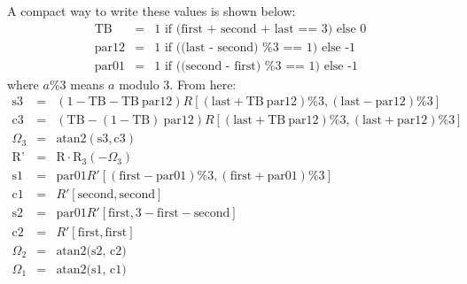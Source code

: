 \documentclass[prb]{revtex4}%
\begin{document}
A compact way to write these values is shown below:
\begin{eqnarray}
  \textrm{TB} &=&   \textrm{1 if (first + second + last == 3) else 0}\\
  \textrm{par12} &=& \textrm{1 if ((last - second) \%3 == 1) else -1} \\
  \textrm{par01} &=&  \textrm{1 if ((second - first) \%3 == 1) else -1}
\end{eqnarray}
where $a \%3$ means $a$ modulo 3.
From here:
\begin{eqnarray}
    \textrm{s3}&=&(1-\textrm{TB}-\textrm{TB}\ \textrm{par12}) R[(\textrm{last}+\textrm{TB}\ \textrm{par12})\%3,(\textrm{last}-\textrm{par12})\%3]\\
    \textrm{c3}&=&(\textrm{TB}-(1-\textrm{TB})\ \textrm{par12})R[(\textrm{last}+\textrm{TB}\ \textrm{par12})\%3,(\textrm{last}+\textrm{par12})\%3]\\
    \Omega_3&=&\textrm{atan2}(\textrm{s3},\textrm{c3})\\
    \textrm{R'}&=&\textrm{R} \cdot \textrm{R}_3(-\Omega_3)\\
    \textrm{s1}&=&\textrm{par01}  R'[(\textrm{first}-\textrm{par01})\%3,(\textrm{first}+\textrm{par01})\%3]\\
    \textrm{c1}&=&R'[\textrm{second},\textrm{second}]\\
    \textrm{s2}&=&\textrm{par01} R'[\textrm{first}, 3 - \textrm{first} - \textrm{second}]\\
    \textrm{c2}&=&R'[\textrm{first}, \textrm{first}]\\
    \Omega_2&=&\textrm{atan2(s2, c2)}\\
    \Omega_1&=&\textrm{atan2(s1, c1)}
\end{eqnarray}
\end{document}
